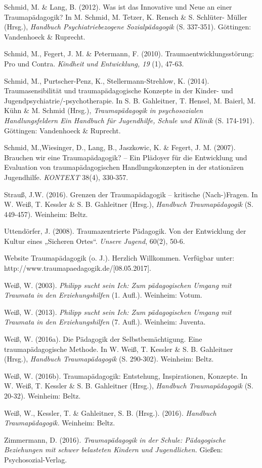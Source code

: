 \hang
Schmid, M. \& Lang, B. (2012). Was ist das Innovative und Neue an einer Traumap{\"a}dagogik? In M. Schmid, M. Tetzer, K. Rensch \& S. Schlüter- Müller (Hrsg.), \textit{Handbuch Psychiatriebezogene Sozialpädagogik} (S. 337-351). Göttingen: Vandenhoeck \& Ruprecht.

\hang
Schmid, M., Fegert, J. M. \& Petermann, F. (2010). Traumaentwicklungsstörung: Pro und Contra. \textit{Kindheit und Entwicklung, 19} (1), 47-63.

\hang
Schmid, M., Purtscher-Penz, K., Stellermann-Strehlow, K. (2014). Traumasensibilit{\"a}t und traumap{\"a}dagogische Konzepte in der Kinder- und Jugendpsychiatrie/-psychotherapie. In S. B. Gahleitner, T. Hensel, M. Baierl, M. K{\"u}hn \& M. Schmid (Hrsg.), \textit{Traumap{\"a}dagogik in psychosozialen Handlungsfeldern Ein Handbuch f{\"u}r Jugendhilfe, Schule und Klinik} (S. 174-191). Göttingen: Vandenhoeck \& Ruprecht.

\hang
Schmid, M.,Wiesinger, D., Lang, B., Jaszkowic, K. \& Fegert, J. M. (2007). Brauchen wir eine Traumap{\"a}dagogik? – Ein Pl{\"a}doyer f{\"u}r die Entwicklung und Evaluation von traumap{\"a}dagogischen Handlungskonzepten in der station{\"a}ren Jugendhilfe. \textit{KONTEXT} 38(4), 330-357.

\hang
Strauß, J.W. (2016). Grenzen der Traumap{\"a}dagogik – kritische (Nach-)Fragen. In W. Weiß, T. Kessler \& S. B. Gahleitner (Hrsg.), \textit{Handbuch Traumapädagogik} (S. 449-457). Weinheim: Beltz.

\hang
Uttendörfer, J. (2008). Traumazentrierte Pädagogik. Von der Entwicklung der Kultur eines „Sicheren Ortes“. \textit{Unsere Jugend}, 60(2), 50-6.

\hang
Website Traumapädagogik (o. J.). Herzlich Willkommen. Verfügbar unter:\\ http://www.traumapaedagogik.de/[08.05.2017].

\hang
Weiß, W. (2003). \textit{Philipp sucht sein Ich: Zum pädagogischen Umgang mit Traumata in den Erziehungshilfen} (1. Aufl.). Weinheim: Votum.

\hang
Weiß, W. (2013). \textit{Philipp sucht sein Ich: Zum pädagogischen Umgang mit Traumata in den Erziehungshilfen} (7. Aufl.). Weinheim: Juventa.

\hang
Weiß, W. (2016a). Die Pädagogik der Selbstbemächtigung. Eine traumapädagogische Methode. In W. Weiß, T. Kessler \& S. B. Gahleitner (Hrsg.), \textit{Handbuch Traumapädagogik} (S. 290-302). Weinheim: Beltz.

\hang
Weiß, W. (2016b). Traumap{\"a}dagogik: Entstehung, Inspirationen, Konzepte. In W. Weiß, T. Kessler \& S. B. Gahleitner (Hrsg.), \textit{Handbuch Traumapädagogik} (S. 20-32). Weinheim: Beltz.

\hang
Weiß, W., Kessler, T. \& Gahleitner, S. B. (Hrsg.). (2016). \textit{Handbuch Traumapädagogik.} Weinheim: Beltz.

\hang
Zimmermann, D. (2016). \textit{Traumapädagogik in der Schule: Pädagogische Beziehungen mit schwer belasteten Kindern und Jugendlichen.} Gießen: Psychosozial-Verlag.
